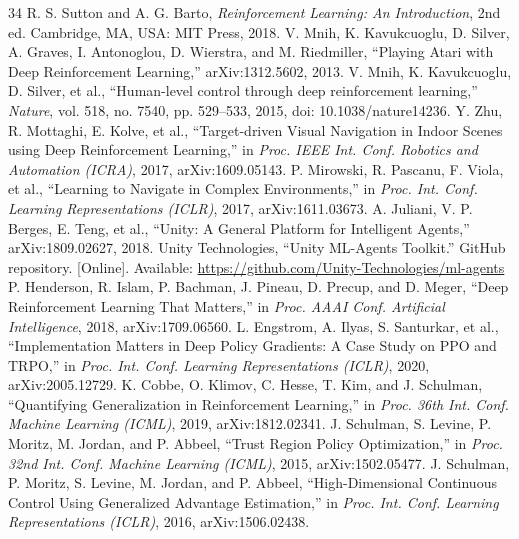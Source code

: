 \documentclass[conference]{IEEEtran}
\begin{document}
\begin{thebibliography}{34}
R. S. Sutton and A. G. Barto, \textit{Reinforcement Learning: An Introduction}, 2nd ed. Cambridge, MA, USA: MIT Press, 2018.
V. Mnih, K. Kavukcuoglu, D. Silver, A. Graves, I. Antonoglou, D. Wierstra, and M. Riedmiller, ``Playing Atari with Deep Reinforcement Learning,'' arXiv:1312.5602, 2013.
V. Mnih, K. Kavukcuoglu, D. Silver, et al., ``Human-level control through deep reinforcement learning,'' \textit{Nature}, vol. 518, no. 7540, pp. 529--533, 2015, doi: 10.1038/nature14236.
Y. Zhu, R. Mottaghi, E. Kolve, et al., ``Target-driven Visual Navigation in Indoor Scenes using Deep Reinforcement Learning,'' in \textit{Proc. IEEE Int. Conf. Robotics and Automation (ICRA)}, 2017, arXiv:1609.05143.
P. Mirowski, R. Pascanu, F. Viola, et al., ``Learning to Navigate in Complex Environments,'' in \textit{Proc. Int. Conf. Learning Representations (ICLR)}, 2017, arXiv:1611.03673.
A. Juliani, V. P. Berges, E. Teng, et al., ``Unity: A General Platform for Intelligent Agents,'' arXiv:1809.02627, 2018.
Unity Technologies, ``Unity {ML-Agents} Toolkit.'' GitHub repository. [Online]. Available: \url{https://github.com/Unity-Technologies/ml-agents}
P. Henderson, R. Islam, P. Bachman, J. Pineau, D. Precup, and D. Meger, ``Deep Reinforcement Learning That Matters,'' in \textit{Proc. AAAI Conf. Artificial Intelligence}, 2018, arXiv:1709.06560.
L. Engstrom, A. Ilyas, S. Santurkar, et al., ``Implementation Matters in Deep Policy Gradients: A Case Study on {PPO} and {TRPO},'' in \textit{Proc. Int. Conf. Learning Representations (ICLR)}, 2020, arXiv:2005.12729.
K. Cobbe, O. Klimov, C. Hesse, T. Kim, and J. Schulman, ``Quantifying Generalization in Reinforcement Learning,'' in \textit{Proc. 36th Int. Conf. Machine Learning (ICML)}, 2019, arXiv:1812.02341.
J. Schulman, S. Levine, P. Moritz, M. Jordan, and P. Abbeel, ``Trust Region Policy Optimization,'' in \textit{Proc. 32nd Int. Conf. Machine Learning (ICML)}, 2015, arXiv:1502.05477.
J. Schulman, P. Moritz, S. Levine, M. Jordan, and P. Abbeel, ``High-Dimensional Continuous Control Using Generalized Advantage Estimation,'' in \textit{Proc. Int. Conf. Learning Representations (ICLR)}, 2016, arXiv:1506.02438.

\end{thebibliography}
\end{document}
